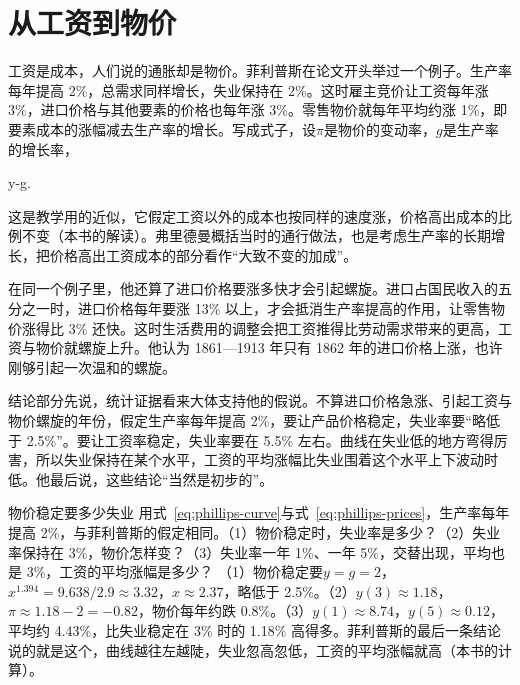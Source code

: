 \section{从工资到物价}\label{sec:phillips-prices}

工资是成本，人们说的通胀却是物价。菲利普斯在论文开头举过一个例子\cite{phillips1958}。生产率每年提高 2\%，总需求同样增长，失业保持在 2\%\cite{phillips1958}。这时雇主竞价让工资每年涨 3\%，进口价格与其他要素的价格也每年涨 3\%\cite{phillips1958}。零售物价就每年平均约涨 1\%，即要素成本的涨幅减去生产率的增长\cite{phillips1958}。写成式子，设$\pi$是物价的变动率，$g$是生产率的增长率，
\begin{keyeq}
\pi\approx y-g.\label{eq:phillips-prices}
\end{keyeq}
这是教学用的近似，它假定工资以外的成本也按同样的速度涨，价格高出成本的比例不变（本书的解读）。弗里德曼概括当时的通行做法，也是考虑生产率的长期增长，把价格高出工资成本的部分看作“大致不变的加成”\cite{friedman1976}。

在同一个例子里，他还算了进口价格要涨多快才会引起螺旋\cite{phillips1958}。进口占国民收入的五分之一时，进口价格每年要涨 13\% 以上，才会抵消生产率提高的作用，让零售物价涨得比 3\% 还快\cite{phillips1958}。这时生活费用的调整会把工资推得比劳动需求带来的更高，工资与物价就螺旋上升\cite{phillips1958}。他认为 1861—1913 年只有 1862 年的进口价格上涨，也许刚够引起一次温和的螺旋\cite{phillips1958}。

结论部分先说，统计证据看来大体支持他的假说\cite{phillips1958}。不算进口价格急涨、引起工资与物价螺旋的年份，假定生产率每年提高 2\%，要让产品价格稳定，失业率要“略低于 2.5\%”\cite{phillips1958}。要让工资率稳定，失业率要在 5.5\% 左右\cite{phillips1958}。曲线在失业低的地方弯得厉害，所以失业保持在某个水平，工资的平均涨幅比失业围着这个水平上下波动时低\cite{phillips1958}。他最后说，这些结论“当然是初步的”\cite{phillips1958}。

\begin{example}{物价稳定要多少失业}\label{ex:phillips-stable}
用式~\eqref{eq:phillips-curve}与式~\eqref{eq:phillips-prices}，生产率每年提高 2\%，与菲利普斯的假定相同。（1）物价稳定时，失业率是多少？（2）失业率保持在 3\%，物价怎样变？（3）失业率一年 1\%、一年 5\%，交替出现，平均也是 3\%，工资的平均涨幅是多少？
\solution
（1）物价稳定要$y=g=2$，$x^{1.394}=9.638/2.9\approx3.32$，$x\approx2.37$，略低于 2.5\%。（2）$y(3)\approx1.18$，$\pi\approx1.18-2=-0.82$，物价每年约跌 0.8\%。（3）$y(1)\approx8.74$，$y(5)\approx0.12$，平均约 4.43\%，比失业稳定在 3\% 时的 1.18\% 高得多。菲利普斯的最后一条结论说的就是这个，曲线越往左越陡，失业忽高忽低，工资的平均涨幅就高（本书的计算）。
\end{example}

